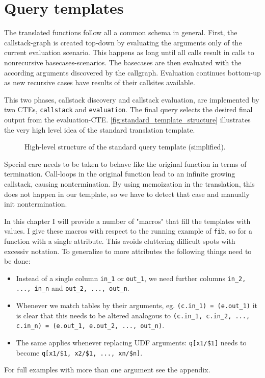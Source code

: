 \chapter{Query templates}\label{template}

The translated functions follow all a common schema in general. First, the callstack-graph is created top-down by evaluating the arguments only of the current evaluation scenario. This happens as long until all calls result in calls to nonrecursive basecases-scenarios. The basecases are then evaluated with the according arguments discovered by the callgraph. Evaluation continues bottom-up as new recursive cases have results of their callsites available.

This two phases, callstack discovery and callstack evaluation, are implemented by two CTEs, \texttt{callstack} and \texttt{evaluation}. The final query selects the desired final output from the evaluation-CTE. \autoref{fig:standard_template_structure} illustrates the very high level idea of the standard translation template.

\begin{figure}[h!]
    \centering
    \caption{High-level structure of the standard query template (simplified).}
    \label{fig:standard_template_structure}
\end{figure}

Special care needs to be taken to behave like the original function in terms of termination. Call-loops in the original function lead to an infinite growing callstack, causing nontermination. By using memoization in the translation, this does not happen in our template, so we have to detect that case and manually init nontermination.

In this chapter I will provide a number of "macros" that fill the templates with values. I give these macros with respect to the running example of \texttt{fib}, so for a function with a single attribute. This avoids cluttering difficult spots with excessiv notation. To generalize to more attributes the following things need to be done:
\begin{itemize}
    \item Instead of a single column \texttt{in\_1} or \texttt{out\_1}, we need further columns \texttt{in\_2, ..., in\_n} and \texttt{out\_2, ..., out\_n}.
    \item Whenever we match tables by their arguments, eg. \texttt{(c.in\_1) = (e.out\_1)} it is clear that this needs to be altered analogous to \texttt{(c.in\_1, c.in\_2, ..., c.in\_n) = (e.out\_1, e.out\_2, ..., out\_n)}.
    \item The same applies whenever replacing UDF arguments: \texttt{q[x1/\$1]} needs to become \texttt{q[x1/\$1, x2/\$1, ..., xn/\$n]}.
\end{itemize}
For full examples with more than one argument see the appendix. 

